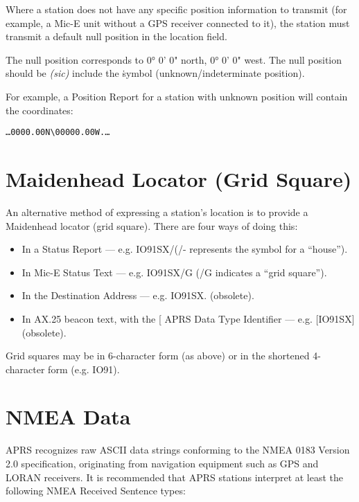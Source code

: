 Where a station does not have any specific position information to transmit
(for example, a Mic-E unit without a GPS receiver connected to it), the
station must transmit a default null position in the location field.

The null position corresponds to 0° 0' 0" north, 0° 0' 0" west.  The
null position should be {\it(sic)} include the \. symbol
(unknown/indeterminate position).

For example, a Position Report for a station with unknown position
will contain the coordinates:

\begin{verbatim}
…0000.00N\00000.00W.…
\end{verbatim}

\section{Maidenhead Locator (Grid Square)}

An alternative method of expressing a station’s location is to provide a
Maidenhead locator (grid square). There are four ways of doing this:

\begin{itemize}
  
\item In a Status Report — e.g. IO91SX/(/- represents the symbol for a “house”).

\item In Mic-E Status Text — e.g. IO91SX/G
(/G indicates a “grid square”).

\item In the Destination Address — e.g. IO91SX. (obsolete).

\item In AX.25 beacon text, with the [ APRS Data Type Identifier — e.g.
[IO91SX] (obsolete).

\end{itemize}

Grid squares may be in 6-character form (as above) or in the shortened
4-character form (e.g. IO91).

\section{NMEA Data}

APRS recognizes raw ASCII data strings conforming to the NMEA 0183
Version 2.0 specification, originating from navigation equipment such as
GPS and LORAN receivers. It is recommended that APRS stations interpret
at least the following NMEA Received Sentence types:

